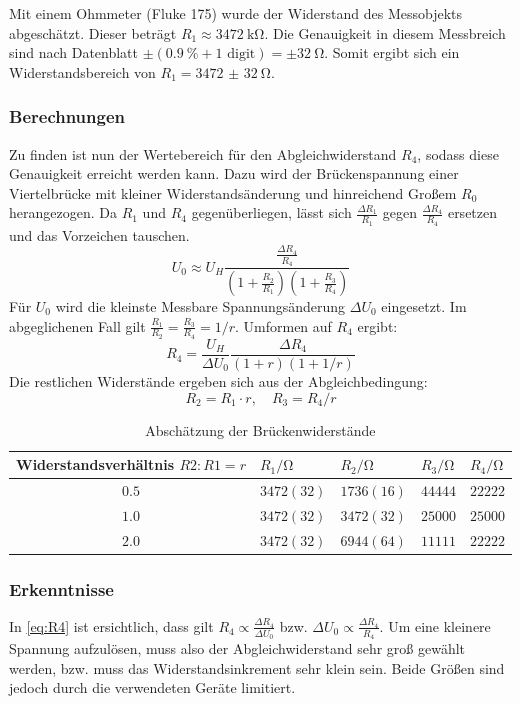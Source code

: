 Mit einem Ohmmeter (Fluke 175) wurde der Widerstand des Messobjekts
abgeschätzt. Dieser beträgt $R_1 \approx \SI{3472}{\kilo\ohm}$. Die Genauigkeit
in diesem Messbreich sind nach Datenblatt $\pm(\SI{0.9}{\percent} + 1 \text{ digit}) = \pm \SI{32}{\ohm}$.
Somit ergibt sich ein Widerstandsbereich von $R_1 = \SI{3472(32)}{\ohm}$.

\subsubsection{Berechnungen}

Zu finden ist nun der Wertebereich für den Abgleichwiderstand $R_4$, sodass
diese Genauigkeit erreicht werden kann. Dazu wird \cite[Gl.~2.5,
	S.~41]{EMTPraktikum2025} der Brückenspannung einer Viertelbrücke mit kleiner
Widerstandsänderung und hinreichend Großem $R_0$ herangezogen. Da $R_1$ und
$R_4$ gegenüberliegen, lässt sich $\frac{\Delta R_1}{R_1}$ gegen $\frac{\Delta
		R_4}{R_4}$ ersetzen und das Vorzeichen tauschen.
\[
	U_0 \approx U_H \frac{\frac{\Delta R_4}{R_4}}{\left(1+\frac{R_2}{R_1}\right)\left(1+\frac{R_3}{R_4}\right)}
\]
Für $U_0$ wird die kleinste Messbare Spannungsänderung $\Delta U_0$ eingesetzt.
Im abgeglichenen Fall gilt $\frac{R_1}{R_2} = \frac{R_3}{R_4} = 1/r$. Umformen
auf $R_4$ ergibt:
\begin{equation}
	R_4 = \frac{U_H}{\Delta U_0} \frac{\Delta R_4}{(1+r)\left(1+1/r\right)}
	\label{eq:R4}
\end{equation}
Die restlichen Widerstände ergeben sich aus der Abgleichbedingung:
\[
	R_2 = R_1 \cdot r, \quad R_3 = R_4 / r
\]

\begin{table}[h]
	\centering
	\caption{Abschätzung der Brückenwiderstände}\label{tab:brueckenabsch}
	\begin{tabularx}{\textwidth}{c|YYYY}
		Widerstandsverhältnis $R2:R1=r$ & $R_1 / \si{\ohm}$ & $R_2 / \si{\ohm}$ & $R_3 / \si{\ohm}$ & $R_4 / \si{\ohm}$ \\ \midrule
		$0.5$                           & $3472(32)$        & $1736(16)$        & $44444$           & $22222$           \\
		$1.0$                           & $3472(32)$        & $3472(32)$        & $25000$           & $25000$           \\
		$2.0$                           & $3472(32)$        & $6944(64)$        & $11111$           & $22222$           \\
	\end{tabularx}
\end{table}

\subsubsection{Erkenntnisse}

In \autoref{eq:R4} ist ersichtlich, dass gilt $R_4 \propto \frac{\Delta
		R_4}{\Delta U_0}$ bzw. $\Delta U_0 \propto \frac{\Delta R_4}{R_4}$. Um eine
kleinere Spannung aufzulösen, muss also der Abgleichwiderstand sehr groß
gewählt werden, bzw. muss das Widerstandsinkrement sehr klein sein. Beide
Größen sind jedoch durch die verwendeten Geräte limitiert.



